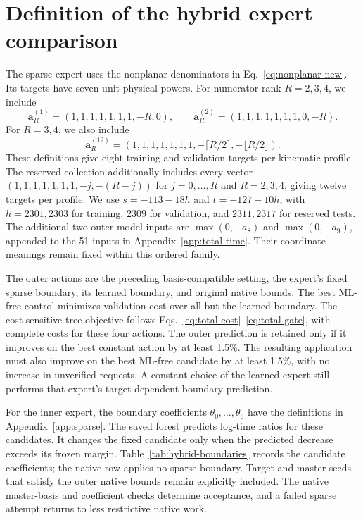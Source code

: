 \section{Definition of the hybrid expert comparison}
\label{app:hybrid-experts}
The sparse expert uses the nonplanar denominators in Eq.~\eqref{eq:nonplanar-new}. Its targets have seven unit physical powers. For numerator rank $R=2,3,4$, we include
\begin{equation}
 \boldsymbol a^{(1)}_R=(1,1,1,1,1,1,1,-R,0),\qquad
 \boldsymbol a^{(2)}_R=(1,1,1,1,1,1,1,0,-R).
\end{equation}
For $R=3,4$, we also include
\begin{equation}
 \boldsymbol a^{(12)}_R=(1,1,1,1,1,1,1,-\lceil R/2\rceil,-\lfloor R/2\rfloor).
\end{equation}
These definitions give eight training and validation targets per kinematic profile. The reserved collection additionally includes every vector $(1,1,1,1,1,1,1,-j,-(R-j))$ for $j=0,\ldots,R$ and $R=2,3,4$, giving twelve targets per profile. We use $s=-113-18h$ and $t=-127-10h$, with $h=2301,2303$ for training, $2309$ for validation, and $2311,2317$ for reserved tests. The additional two outer-model inputs are $\max(0,-a_8)$ and $\max(0,-a_9)$, appended to the 51 inputs in Appendix~\ref{app:total-time}. Their coordinate meanings remain fixed within this ordered family.

The outer actions are the preceding basis-compatible setting, the expert's fixed sparse boundary, its learned boundary, and original native bounds. The best ML-free control minimizes validation cost over all but the learned boundary. The cost-sensitive tree objective follows Eqs.~\eqref{eq:total-cost}--\eqref{eq:total-gate}, with complete costs for these four actions. The outer prediction is retained only if it improves on the best constant action by at least 1.5\%. The resulting application must also improve on the best ML-free candidate by at least 1.5\%, with no increase in unverified requests. A constant choice of the learned expert still performs that expert's target-dependent boundary prediction.

For the inner expert, the boundary coefficients $\theta_0,\ldots,\theta_6$ have the definitions in Appendix~\ref{app:sparse}. The saved forest predicts log-time ratios for these candidates. It changes the fixed candidate only when the predicted decrease exceeds its frozen margin. Table~\ref{tab:hybrid-boundaries} records the candidate coefficients; the native row applies no sparse boundary. Target and master seeds that satisfy the outer native bounds remain explicitly included. The native master-basis and coefficient checks determine acceptance, and a failed sparse attempt returns to less restrictive native work.

